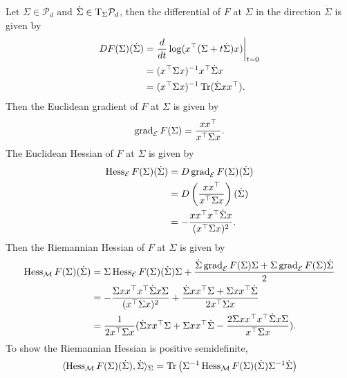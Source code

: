 \documentclass[en, oneside]{assignment}
\begin{document}
\begin{sol}
\begin{enumerate}[label=(\arabic*)]
        Let $\Sigma \in \mathcal P_d$ and $\dot \Sigma \in \text T _\Sigma \mathcal P_d$, 
        then the differential of $F$ at $\Sigma$ in the direction $\dot \Sigma$ is given by
        \begin{align*}
            DF(\Sigma)(\dot \Sigma) &= \frac{d}{dt} \log (x^\top (\Sigma + t \dot \Sigma) x) \bigg|_{t=0} \\
            &= (x^\top \Sigma x)^{-1} x^\top \dot \Sigma x \\
            &= (x^\top \Sigma x)^{-1} \operatorname{Tr} (\dot \Sigma x x^\top).
        \end{align*}
        Then the Euclidean gradient of $F$ at $\Sigma$ is given by
        \begin{equation*}
            \operatorname{grad} _\mathcal E F (\Sigma) = \frac{x x^\top}{x^\top \Sigma x}.
        \end{equation*}
        The Euclidean Hessian of $F$ at $\Sigma$ is given by
        \begin{align*}
            \operatorname{Hess} _\mathcal E F (\Sigma)(\dot \Sigma) &= D \operatorname{grad} _\mathcal E F (\Sigma)(\dot \Sigma) \\
            &= D \left(\frac{x x^\top}{x^\top \Sigma x}\right)(\dot \Sigma) \\
            &= -\frac{x x^\top x^\top \dot \Sigma x}{(x^\top \Sigma x)^2}.
        \end{align*}
        Then the Riemannian Hessian of $F$ at $\Sigma$ is given by
        \begin{align*}
            \operatorname{Hess} _\mathcal M F (\Sigma)(\dot \Sigma) &= \Sigma \operatorname{Hess} _\mathcal E F (\Sigma)(\dot \Sigma) \Sigma 
            + \frac{\dot \Sigma \operatorname{grad} _\mathcal E F (\Sigma) \Sigma + \Sigma \operatorname{grad} _\mathcal E F (\Sigma) \dot \Sigma}{2}\\
            &= -\frac{\Sigma x x^\top x^\top \dot \Sigma x \Sigma}{(x^\top \Sigma x)^2} + 
            \frac{\dot \Sigma x x^\top \Sigma + \Sigma x x^\top \dot \Sigma}{2 x^\top \Sigma x}\\
            &= \frac{1}{2 x^\top \Sigma x} (\dot \Sigma x x^\top \Sigma + \Sigma x x^\top \dot \Sigma 
            - \frac{2 \Sigma x x^\top x^\top \dot \Sigma x \Sigma}{x^\top \Sigma x}).
        \end{align*}
        To show the Riemannian Hessian is positive semidefinite,
        \begin{align*}
            \langle \Hess _\mathcal M F (\Sigma)(\dot \Sigma), \dot \Sigma \rangle _\Sigma &= 
            \tr \left(\Sigma^{-1} \Hess _\mathcal M F (\Sigma)(\dot \Sigma) \Sigma^{-1} \dot \Sigma\right) \\

\end{align*}
\end{enumerate}
\end{sol}
\end{document}
